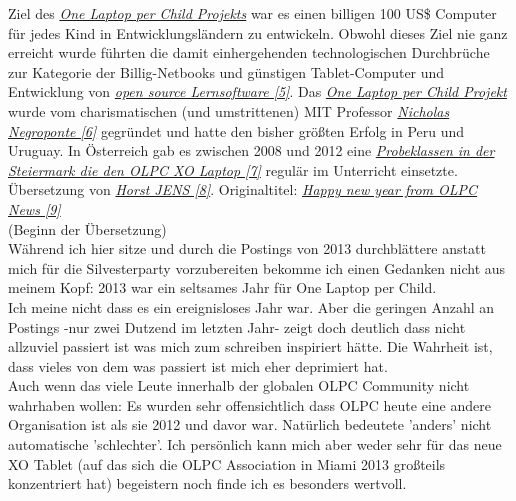 \documentclass[10pt,a4paper,ngerman,twoside]{article} %
\begin{document}
Ziel des \href{http://one.laptop.org/}{\textit{One Laptop per Child Projekts}} war es einen billigen 100 US\$ Computer für jedes Kind in Entwicklungsländern zu entwickeln. Obwohl dieses Ziel nie ganz erreicht wurde führten die damit einhergehenden technologischen Durchbrüche zur Kategorie der Billig-Netbooks und günstigen Tablet-Computer und Entwicklung von \href{https://en.wikipedia.org/wiki/Sugar_(desktop_environment)}{\textit{open source Lernsoftware [5]}}. Das \href{http://one.laptop.org/}{\textit{One Laptop per Child Projekt}} wurde vom charismatischen (und umstrittenen) MIT Professor \href{https://de.wikipedia.org/wiki/Nicholas_Negroponte}{\textit{Nicholas Negroponte [6]}} gegründet und hatte den bisher größten Erfolg in Peru und Uruguay. In Österreich gab es zwischen 2008 und 2012 eine \href{http://www.fuzo-archiv.at/artikel/1503081v2}{\textit{Probeklassen in der Steiermark die den OLPC XO Laptop [7]}} regulär im Unterricht einsetzte. \\

Übersetzung von \href{http://spielend-programmieren.at}{\textit{Horst JENS [8]}}. Originaltitel: \href{http://www.olpcnews.com/commentary/olpc_news/happy_new_year_from_olpc_news.html}{\textit{Happy new year from OLPC News [9]}} \\

(Beginn der Übersetzung) \\

Während ich hier sitze und durch die Postings von 2013 durchblättere anstatt mich für die Silvesterparty vorzubereiten bekomme ich einen Gedanken nicht aus meinem Kopf: 2013 war ein seltsames Jahr für One Laptop per Child. \\

Ich meine nicht dass es ein ereignisloses Jahr war. Aber die geringen Anzahl an Postings -nur zwei Dutzend im letzten Jahr- zeigt doch deutlich dass nicht allzuviel passiert ist was mich zum schreiben inspiriert hätte. Die Wahrheit ist, dass vieles von dem was passiert ist mich eher deprimiert hat. \\

Auch wenn das viele Leute innerhalb der globalen OLPC Community nicht wahrhaben wollen: Es wurden sehr offensichtlich dass OLPC heute eine andere Organisation ist als sie 2012 und davor war. Natürlich bedeutete 'anders' nicht automatische 'schlechter'. Ich persönlich kann mich aber weder sehr für das neue XO Tablet (auf das sich die OLPC Association in Miami 2013 großteils konzentriert hat) begeistern noch finde ich es besonders wertvoll. \\
\end{document}
